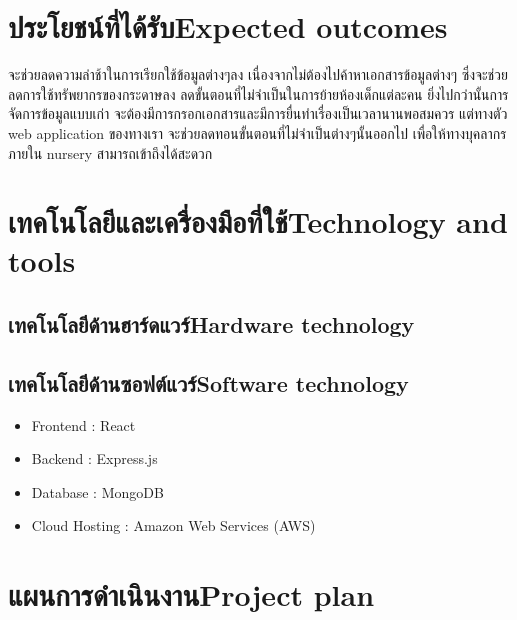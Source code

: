 \section{\ifcpe ประโยชน์ที่ได้รับ\else Expected outcomes\fi}
จะช่วยลดความล่าช้าในการเรียกใช้ข้อมูลต่างๆลง    
  เนื่องจากไม่ต้องไปค้าหาเอกสารข้อมูลต่างๆ ซึ่งจะช่วยลดการใช้ทรัพยากรของกระดาษลง  ลดขั้นตอนที่ไม่จำเป็นในการย้ายห้องเด็กแต่ละคน ยิ่งไปกว่านั้นการจัดการข้อมูลแบบเก่า  จะต้องมีการกรอกเอกสารและมีการยื่นทำเรื่องเป็นเวลานานพอสมควร แต่ทางตัว web application ของทางเรา จะช่วยลดทอนขั้นตอนที่ไม่จำเป็นต่างๆนั้นออกไป เพื่อให้ทางบุคลากรภายใน nursery สามารถเข้าถึงได้สะดวก

\section{\ifcpe เทคโนโลยีและเครื่องมือที่ใช้\else Technology and tools\fi}

\subsection{\ifcpe เทคโนโลยีด้านฮาร์ดแวร์\else Hardware technology\fi}


\subsection{\ifcpe เทคโนโลยีด้านซอฟต์แวร์\else Software technology\fi}
\begin{itemize}
    \item Frontend : React 	
    \item Backend : Express.js 
    \item Database : MongoDB
    \item Cloud Hosting : Amazon Web Services (AWS)
\end{itemize}



\section{\ifcpe แผนการดำเนินงาน\else Project plan\fi}


